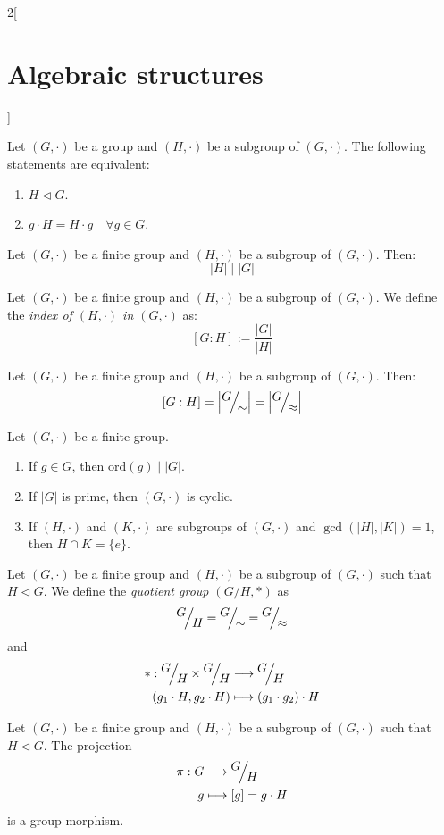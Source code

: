 \documentclass[../../../main.tex]{subfiles}
\begin{document}
\begin{multicols}{2}[\section{Algebraic structures}]
\begin{prop}
    Let $(G,\cdot)$ be a group and $(H,\cdot)$ be a subgroup of $(G,\cdot)$. The following statements are equivalent:
    \begin{enumerate}
        \item $H\lhd G$.
        \item $g\cdot H=H\cdot g\quad\forall g\in G$.
    \end{enumerate}
\end{prop}
\begin{theorem}
    Let $(G,\cdot)$ be a finite group and $(H,\cdot)$ be a subgroup of $(G,\cdot)$. Then: $$|H|\mid|G|$$
\end{theorem}
\begin{definition}
    Let $(G,\cdot)$ be a finite group and $(H,\cdot)$ be a subgroup of $(G,\cdot)$. We define the \textit{index of $(H,\cdot)$ in $(G,\cdot)$} as: $$[G:H]:=\frac{|G|}{|H|}$$
\end{definition}
\begin{corollary}
    Let $(G,\cdot)$ be a finite group and $(H,\cdot)$ be a subgroup of $(G,\cdot)$. Then: $$[G:H]=\left|\quot{G}{\sim}\right|=\left|\quot{G}{\approx}\right|$$
\end{corollary}
\begin{corollary}
    Let $(G,\cdot)$ be a finite group. 
    \begin{enumerate}
        \item If $g\in G$, then $\text{ord}(g)\mid |G|$.
        \item If $|G|$ is prime, then $(G,\cdot)$ is cyclic.
        \item If $(H,\cdot)$ and $(K,\cdot)$ are subgroups of $(G,\cdot)$ and $\gcd(|H|,|K|)=1$, then $H\cap K=\{e\}$.
    \end{enumerate}
\end{corollary}
\begin{definition}
    Let $(G,\cdot)$ be a finite group and $(H,\cdot)$ be a subgroup of $(G,\cdot)$ such that $H\lhd G$. We define the \textit{quotient group $\left(G/H,*\right)$} as $$\quot{G}{H}=\quot{G}{\sim}=\quot{G}{\approx}$$ and 
\begin{align*}
    *:\quot{G}{H}\times\quot{G}{H}&\longrightarrow\quot{G}{H}\\
    (g_1\cdot H,g_2\cdot H)&\longmapsto (g_1\cdot g_2)\cdot H
\end{align*}
\end{definition}
\begin{lemma}
Let $(G,\cdot)$ be a finite group and $(H,\cdot)$ be a subgroup of $(G,\cdot)$ such that $H\lhd G$. The projection 
\begin{align*}
    \pi:G&\longrightarrow\quot{G}{H}\\
    g&\longmapsto[g]=g\cdot H
\end{align*}
is a group morphism.
\end{lemma}

\end{multicols}
\end{document}
